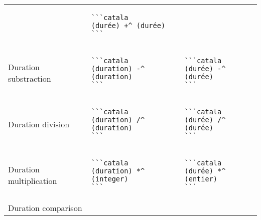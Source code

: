 \documentclass[a3paper,landscape]{article}
\begin{document}
\begin{multicols*}{2}
\begin{center}
\begin{tabular}{p{}p{}p{}}
                                      &
      \vspace*{-1.75em}
      \begin{verbatim}
```catala
(durée) +^ (durée)
```
\end{verbatim}
      \vspace*{-1.75em}
      \\
      Duration substraction           &
      \vspace*{-1.75em}
      \begin{verbatim}
```catala
(duration) -^ (duration)
```
\end{verbatim}
      \vspace*{-1.75em}
                                      &
      \vspace*{-1.75em}
      \begin{verbatim}
```catala
(durée) -^ (durée)
```
\end{verbatim}
      \vspace*{-1.75em}
      \\
      Duration division               &
      \vspace*{-1.75em}
      \begin{verbatim}
```catala
(duration) /^ (duration)
```
\end{verbatim}
      \vspace*{-1.75em}
                                      &
      \vspace*{-1.75em}
      \begin{verbatim}
```catala
(durée) /^ (durée)
```
\end{verbatim}
      \vspace*{-1.75em}
      \\
      Duration multiplication         &
      \vspace*{-1.75em}
      \begin{verbatim}
```catala
(duration) *^ (integer)
```
\end{verbatim}
      \vspace*{-1.75em}
                                      &
      \vspace*{-1.75em}
      \begin{verbatim}
```catala
(durée) *^ (entier)
```
\end{verbatim}
      \vspace*{-1.75em}
      \\
      Duration comparison             &
      \vspace*{-1.75em}

\end{tabular}
\end{center}
\end{multicols*}
\end{document}
